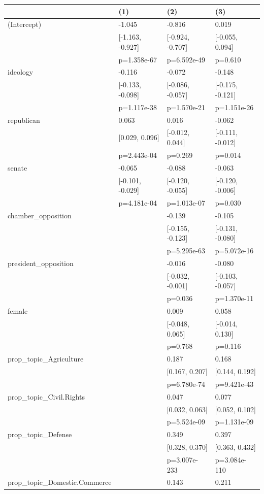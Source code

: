 \begin{tabular}{llll}
\hline
& (1) & (2) & (3) \\ \hline
(Intercept) & -1.045 & -0.816 & 0.019 \\
& [-1.163, -0.927] & [-0.924, -0.707] & [-0.055, 0.094] \\
& p=1.358e-67 & p=6.592e-49 & p=0.610 \\
ideology & -0.116 & -0.072 & -0.148 \\
& [-0.133, -0.098] & [-0.086, -0.057] & [-0.175, -0.121] \\
& p=1.117e-38 & p=1.570e-21 & p=1.151e-26 \\
republican & 0.063 & 0.016 & -0.062 \\
& [0.029, 0.096] & [-0.012, 0.044] & [-0.111, -0.012] \\
& p=2.443e-04 & p=0.269 & p=0.014 \\
senate & -0.065 & -0.088 & -0.063 \\
& [-0.101, -0.029] & [-0.120, -0.055] & [-0.120, -0.006] \\
& p=4.181e-04 & p=1.013e-07 & p=0.030 \\
chamber_opposition &  & -0.139 & -0.105 \\
&  & [-0.155, -0.123] & [-0.131, -0.080] \\
&  & p=5.295e-63 & p=5.072e-16 \\
president_opposition &  & -0.016 & -0.080 \\
&  & [-0.032, -0.001] & [-0.103, -0.057] \\
&  & p=0.036 & p=1.370e-11 \\
female &  & 0.009 & 0.058 \\
&  & [-0.048, 0.065] & [-0.014, 0.130] \\
&  & p=0.768 & p=0.116 \\
prop_topic_Agriculture &  & 0.187 & 0.168 \\
&  & [0.167, 0.207] & [0.144, 0.192] \\
&  & p=6.780e-74 & p=9.421e-43 \\
prop_topic_Civil.Rights &  & 0.047 & 0.077 \\
&  & [0.032, 0.063] & [0.052, 0.102] \\
&  & p=5.524e-09 & p=1.131e-09 \\
prop_topic_Defense &  & 0.349 & 0.397 \\
&  & [0.328, 0.370] & [0.363, 0.432] \\
&  & p=3.007e-233 & p=3.084e-110 \\
prop_topic_Domestic.Commerce &  & 0.143 & 0.211 \\

\end{tabular}
